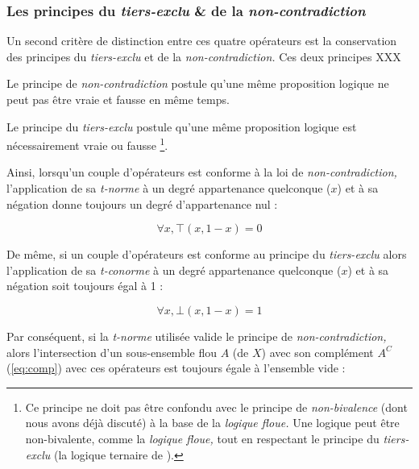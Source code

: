 

\subsubsection{Les principes du \emph{tiers-exclu} \& de la
  \emph{non-contradiction}}

Un second critère de distinction entre ces quatre opérateurs est la
conservation des principes du \emph{tiers-exclu} et de la
\emph{non-contradiction.} Ces deux principes XXX

Le principe de \emph{non-contradiction} postule qu'une même
proposition logique ne peut pas être vraie et fausse en même temps.


Le principe du \emph{tiers-exclu} postule qu'une même proposition
logique est nécessairement vraie ou fausse \footnote{Ce principe ne
  doit pas être confondu avec le principe de \emph{non-bivalence}
  (dont nous avons déjà discuté) à la base de la \emph{logique floue.}
  Une logique peut être non-bivalente, comme la \emph{logique floue,}
  tout en respectant le principe du \emph{tiers-exclu} (\eg la logique
  ternaire de ).}.






Ainsi, lorsqu'un couple d'opérateurs est conforme à la loi de
\emph{non-contradiction,} l’application de sa \emph{t-norme} à un
degré appartenance quelconque (\(x\)) et à sa négation donne toujours
un degré d'appartenance nul :

\begin{equation}
  \forall x, ⊤(x,1-x) = 0
\end{equation}

De même, si un couple d'opérateurs est conforme au principe du
\emph{tiers-exclu} alors l’application de sa \emph{t-conorme} à un
degré appartenance quelconque (\(x\))  et à sa négation soit
toujours égal à 1 :

\begin{equation}
  \forall x, ⊥(x,1-x) = 1
\end{equation}

Par conséquent, si la \emph{t-norme} utilisée valide le principe de
\emph{non-contradiction,} alors l'intersection d'un sous-ensemble flou
\(A\) (de \(X\)) avec son complément \(A^C\) (\autoref{eq:comp}) avec
ces opérateurs est toujours égale à l'ensemble vide :

